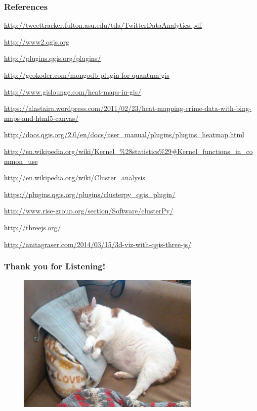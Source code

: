 \documentclass[hyperref={pdfpagelabels=true}]{beamer}
\begin{document}
\begin{frame}
\frametitle{References}
\begin{itemize}\tiny{
\item \url{http://tweettracker.fulton.asu.edu/tda/TwitterDataAnalytics.pdf}
\item \url{http://www2.qgis.org}
\item \url{http://plugins.qgis.org/plugins/}
\item \url{http://geokoder.com/mongodb-plugin-for-quantum-gis}
\item \url{http://www.gislounge.com/heat-maps-in-gis/}
\item \url{https://alastaira.wordpress.com/2011/02/23/heat-mapping-crime-data-with-bing-maps-and-html5-canvas/}
\item \url{http://docs.qgis.org/2.0/en/docs/user_manual/plugins/plugins_heatmap.html}
\item \url{http://en.wikipedia.org/wiki/Kernel_\%28statistics\%29\#Kernel\_functions\_in\_common\_use}
\item \url{http://en.wikipedia.org/wiki/Cluster_analysis}
\item \url{https://plugins.qgis.org/plugins/clusterpy_qgis_plugin/}
\item \url{http://www.rise-group.org/section/Software/clusterPy/}
\item \url{http://threejs.org/}
\item \url{http://anitagraser.com/2014/03/15/3d-viz-with-qgis-three-js/} }
\end{itemize}
\end{frame}

\begin{frame}
\frametitle{Thank you for Listening!}
    \begin{figure}  
      \includegraphics[width=0.8\textwidth]{fat-cat.jpg}    
     \end{figure}  
\end{frame}
\end{document}
